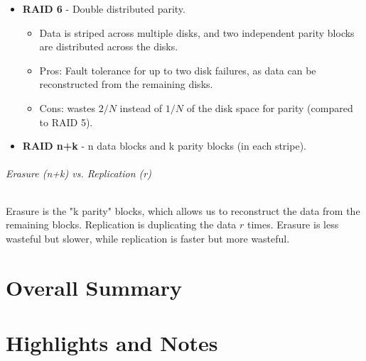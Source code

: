 \documentclass[openany,12pt]{book}
\begin{document}
\begin{itemize}
  \item \textbf{RAID 6} - Double distributed parity.\\
  \begin{itemize}
    \item Data is striped across multiple disks, and two independent parity blocks are distributed across the disks.
    \item Pros: Fault tolerance for up to two disk failures, as data can be reconstructed from the remaining disks. 
    \item Cons: wastes \(2/N\) instead of \(1/N\) of the disk space for parity (compared to RAID 5).
  \end{itemize}

  \item \textbf{RAID n+k} - n data blocks and k parity blocks (in each stripe).
\end{itemize}

\paragraph{Erasure (n+k) vs. Replication (r)} Erasure is the "k parity" blocks, which allows us to reconstruct the data from the remaining blocks. Replication is duplicating the data \(r\) times. Erasure is less wasteful but slower, while replication is faster but more wasteful.







\newpage
\part{Overall Summary}













\newpage
\part{Highlights and Notes}






\end{document}
